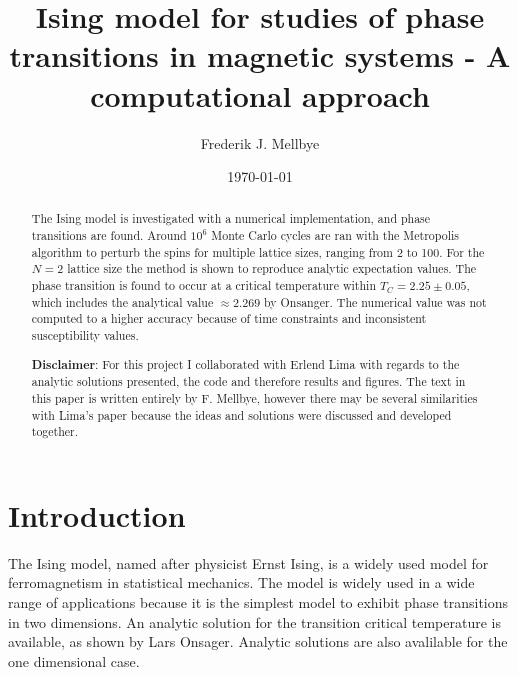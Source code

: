 \documentclass[aps,reprint]{revtex4-1}
\begin{document}
\title{Ising model for studies of phase transitions in magnetic systems - A computational approach}
\author{Frederik J. Mellbye}
\date{\today}

\begin{abstract}\noindent
The Ising model is investigated with a numerical implementation, and phase transitions
are found. Around $10^6$ Monte Carlo cycles are ran with the Metropolis
algorithm to perturb the spins for multiple lattice sizes, ranging from
2 to 100. For the $N = 2$ lattice size the method is shown to reproduce analytic
expectation values. The phase transition is found to occur at a critical temperature
within $T_C = 2.25 \pm 0.05$, which includes the analytical value $\approx 2.269$ by Onsanger.
The numerical value was not computed to a higher accuracy because of time
constraints and inconsistent susceptibility values.

\bigskip
\noindent \textbf{Disclaimer}:
\newline
For this project I collaborated with Erlend Lima with regards to the
analytic solutions presented, the code and therefore results and figures.
The text in this paper is written entirely by F. Mellbye, however there may be
several similarities with Lima's paper because the ideas and solutions
were discussed and developed together.
\end{abstract}
\maketitle
\tableofcontents
\makeatletter
\let\toc@pre\relax
\let\toc@post\relax
\makeatother

\newpage

\section{Introduction} \label{sec:introduction}
The Ising model, named after physicist Ernst Ising, is a widely used model for
ferromagnetism in statistical mechanics. The model is widely used in a wide range
of applications because it is the simplest model to exhibit phase transitions
in two dimensions. An analytic solution for the transition critical temperature
is available, as shown by Lars Onsager. Analytic solutions are also avalilable
for the one dimensional case.
\end{document}
